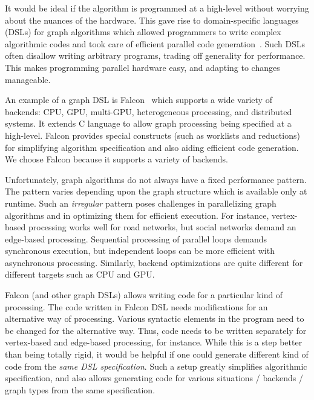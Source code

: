 \documentclass[12pt]{article}
\begin{document}
It would be ideal if the algorithm is programmed at a high-level without worrying about the nuances of the hardware.
This gave rise to domain-specific languages (DSLs) for graph algorithms which allowed programmers to write complex algorithmic codes and took care of efficient parallel code generation~\cite{greenmarl, lighthouse, falcon}.
Such DSLs often disallow writing arbitrary programs, trading off generality for performance.
This makes programming parallel hardware easy, and adapting to changes manageable.

An example of a graph DSL is Falcon~\cite{falcon, dhfalcon} which supports a wide variety of backends: CPU, GPU, multi-GPU, heterogeneous processing, and distributed systems. 
It extends C language to allow graph processing being specified at a high-level.
Falcon provides special constructs (such as worklists and reductions) for simplifying algorithm specification and also aiding efficient code generation.
We choose Falcon because it supports a variety of backends.

Unfortunately, graph algorithms do not always have a fixed performance pattern.
The pattern varies depending upon the graph structure which is available only at runtime.
Such an \textit{irregular} pattern poses challenges in parallelizing graph algorithms and in optimizing them for efficient execution.
For instance, vertex-based processing works well for road networks, but social networks demand an edge-based processing.
Sequential processing of parallel loops demands synchronous execution, but independent loops can be more efficient with asynchronous processing.
Similarly, backend optimizations are quite different for different targets such as CPU and GPU.

Falcon (and other graph DSLs) allows writing code for a particular kind of processing. %
The code written in Falcon DSL needs modifications for an alternative way of processing.
Various syntactic elements in the program need to be changed for the alternative way. 
Thus, code needs to be written separately for vertex-based and edge-based processing, for instance.
While this is a step better than being totally rigid, it would be helpful if one could generate different kind of code from the \textit{same DSL specification}.
Such a setup greatly simplifies algorithmic specification, and also allows generating code for various situations / backends / graph types from the same specification.
\end{document}
